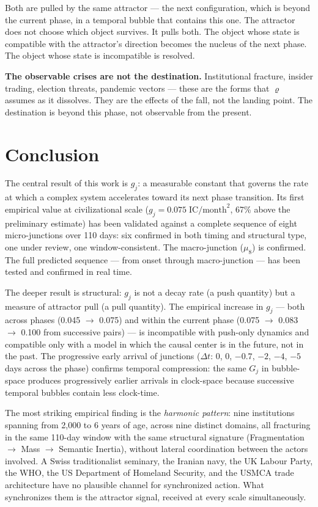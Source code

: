 \documentclass[12pt,a4paper]{article}
\newcommand{\gj}{g_j}
\begin{document}
Both are pulled by the same attractor --- the next configuration, which is beyond the current phase, in a temporal bubble that contains this one. The attractor does not choose which object survives. It pulls both. The object whose state is compatible with the attractor's direction becomes the nucleus of the next phase. The object whose state is incompatible is resolved.

\textbf{The observable crises are not the destination.} Institutional fracture, insider trading, election threats, pandemic vectors --- these are the forms that $\varrho$ assumes as it dissolves. They are the effects of the fall, not the landing point. The destination is beyond this phase, not observable from the present.


\section{Conclusion}

The central result of this work is $\gj$: a measurable constant that governs the rate at which a complex system accelerates toward its next phase transition. Its first empirical value at civilizational scale ($\gj = 0.075\;\mathrm{IC/month}^2$, 67\% above the preliminary estimate) has been validated against a complete sequence of eight micro-junctions over 110 days: six confirmed in both timing and structural type, one under review, one window-consistent. The macro-junction ($\mu_8$) is confirmed. The full predicted sequence --- from onset through macro-junction --- has been tested and confirmed in real time.

The deeper result is structural: $\gj$ is not a decay rate (a push quantity) but a measure of attractor pull (a pull quantity). The empirical increase in $\gj$ --- both across phases (0.045 $\to$ 0.075) and within the current phase (0.075 $\to$ 0.083 $\to$ 0.100 from successive pairs) --- is incompatible with push-only dynamics and compatible only with a model in which the causal center is in the future, not in the past. The progressive early arrival of junctions ($\Delta t$: 0, 0, $-0.7$, $-2$, $-4$, $-5$ days across the phase) confirms temporal compression: the same $G_j$ in bubble-space produces progressively earlier arrivals in clock-space because successive temporal bubbles contain less clock-time.

The most striking empirical finding is the \emph{harmonic pattern}: nine institutions spanning from 2,000 to 6 years of age, across nine distinct domains, all fracturing in the same 110-day window with the same structural signature (Fragmentation $\to$ Mass $\to$ Semantic Inertia), without lateral coordination between the actors involved. A Swiss traditionalist seminary, the Iranian navy, the UK Labour Party, the WHO, the US Department of Homeland Security, and the USMCA trade architecture have no plausible channel for synchronized action. What synchronizes them is the attractor signal, received at every scale simultaneously.
\end{document}
